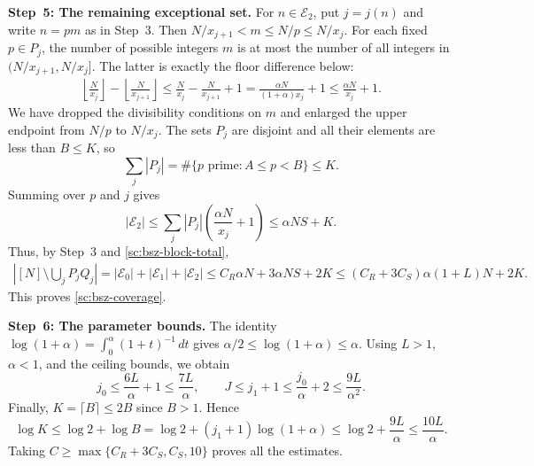 \documentclass[twoside]{aomart}
\makeatletter
\theoremstyle{paperplain}
\theoremstyle{paperdefinition}
\renewenvironment{proof}[1][\proofname]{\par\pushQED{\qed}%
  \normalfont\topsep6\p@\@plus3\p@\relax\trivlist
  \item[\hskip\labelsep\itshape #1\@addpunct{.}]\ignorespaces
}{\popQED\endtrivlist\@endpefalse}
\numberwithin{equation}{section}
\makeatother
\begin{document}
\begin{proof}
\par
\medskip
\noindent\textbf{Step~5: The remaining exceptional set.}
For $n\in\mathcal E_2$, put $j=j(n)$ and write $n=pm$
as in Step~3. Then $N/x_{j+1}<m\le N/p\le N/x_j$.
For each fixed $p\in P_j$, the number of possible integers $m$
is at most the number of all integers in $(N/x_{j+1},N/x_j]$.
The latter is exactly the floor difference below:
\begin{equation*}
 \begin{aligned}
 \left\lfloor\frac{N}{x_j}\right\rfloor
 -\left\lfloor\frac{N}{x_{j+1}}\right\rfloor
 \le\frac{N}{x_j}-\frac{N}{x_{j+1}}+1
 =\frac{\alpha N}{(1+\alpha)x_j}+1
 \le\frac{\alpha N}{x_j}+1.
 \end{aligned}
 \end{equation*}
We have dropped the divisibility conditions on $m$ and enlarged
the upper endpoint from $N/p$ to $N/x_j$.
The sets $P_j$ are disjoint and all their elements are less than
$B\le K$, so
\begin{equation*}
 \sum_j|P_j|=\#\{p\text{ prime}:A\le p<B\}\le K.
 \end{equation*}
Summing over $p$ and $j$ gives
\begin{equation*}
 |\mathcal E_2|
 \le\sum_j|P_j|\left(\frac{\alpha N}{x_j}+1\right)
 \le\alpha NS+K.
 \end{equation*}
Thus, by Step~3 and \eqref{sc:bsz-block-total},
\begin{equation*}
 \begin{aligned}
 \left|[N]\setminus\bigcup_jP_jQ_j\right|
=|\mathcal E_0|+|\mathcal E_1|+|\mathcal E_2|
 \le C_R\alpha N+3\alpha NS+2K
 \le(C_R+3C_S)\alpha(1+L)N+2K.
 \end{aligned}
 \end{equation*}
This proves \eqref{sc:bsz-coverage}.

\par
\medskip
\noindent\textbf{Step~6: The parameter bounds.}
The identity $\displaystyle \log(1+\alpha)=\int_0^\alpha(1+t)^{-1}\,dt$
gives $\alpha/2\le\log(1+\alpha)\le\alpha$.
Using $L>1$, $\alpha<1$, and the ceiling bounds, we obtain
\begin{equation*}
 j_0\le\frac{6L}{\alpha}+1\le\frac{7L}{\alpha},
 \qquad
 J\le j_1+1\le\frac{j_0}{\alpha}+2
 \le\frac{9L}{\alpha^2}.
 \end{equation*}
Finally, $K=\lceil B\rceil\le2B$ since $B>1$. Hence
\begin{equation*}
 \log K\le\log2+\log B
 =\log2+(j_1+1)\log(1+\alpha)
 \le\log2+\frac{9L}{\alpha}\le\frac{10L}{\alpha}.
 \end{equation*}
Taking $C\ge\max\{C_R+3C_S,C_S,10\}$ proves all the estimates.
\end{proof}
\end{document}
